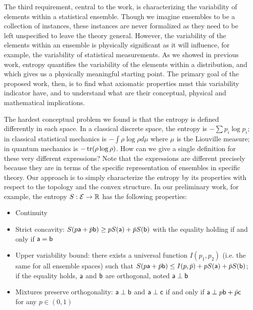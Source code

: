 The third requirement, central to the work, is characterizing the variability of elements within a statistical ensemble. Though we imagine ensembles to be a collection of instances, these instances are never formalized as they need to be left unspecified to leave the theory general. However, the variability of the elements within an ensemble is physically significant as it will influence, for example, the variability of statistical measurements. As we showed in previous work, entropy quantifies the variability of the elements within a distribution, and which gives us a physically meaningful starting point. The primary goal of the proposed work, then, is to find what axiomatic properties must this variability indicator have, and to understand what are their conceptual, physical and mathematical implications.

The hardest conceptual problem we found is that the entropy is defined differently in each space. In a classical discrete space, the entropy is $-\sum p_i \log p_i$; in classical statistical mechanics is $- \int \rho \log \rho d\mu$ where $\mu$ is the Liouville measure; in quantum mechanics is $-\tr(\rho \log \rho)$. How can we give a single definition for these very different expressions? Note that the expressions are different precisely because they are in terms of the specific representation of ensembles in specific theory. Our approach is to simply characterize the entropy by its properties with respect to the topology and the convex structure. In our preliminary work, for example, the entropy $S : \Ens \to \mathbb{R}$ has the following properties:
\begin{itemize}
	\item Continuity
	\item Strict concavity: $S(p\ens[a] + \bar{p} \ens[b]) \geq p S(\ens[a]) + \bar{p} S(\ens[b])$ with the equality holding if and only if $\ens[a] = \ens[b]$
	\item Upper variability bound: there exists a universal function $I(p_1, p_2)$ (i.e. the same for all ensemble spaces) such that $S(p\ens[a] + \bar{p} \ens[b]) \leq I(p, \bar{p}) + p S(\ens[a]) + \bar{p} S(\ens[b])$; if the equality holds, $\ens[a]$ and $\ens[b]$ are orthogonal, noted $\ens[a] \ortho \ens[b]$
	\item Mixtures preserve orthogonality: $\ens[a] \ortho \ens[b]$ and $\ens[a] \ortho \ens[c]$ if and only if $\ens[a] \ortho p \ens[b] + \bar{p} \ens[c]$ for any $p \in (0,1)$
\end{itemize}

